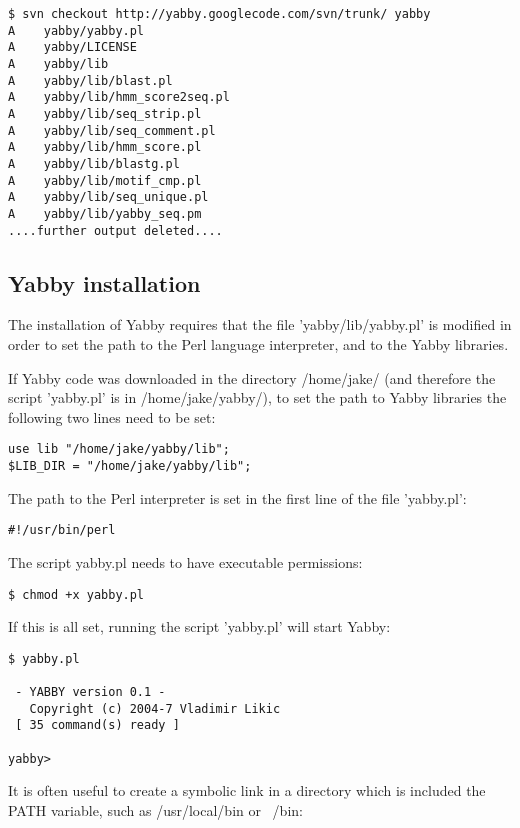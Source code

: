 \begin{verbatim}
$ svn checkout http://yabby.googlecode.com/svn/trunk/ yabby
A    yabby/yabby.pl
A    yabby/LICENSE
A    yabby/lib
A    yabby/lib/blast.pl
A    yabby/lib/hmm_score2seq.pl
A    yabby/lib/seq_strip.pl
A    yabby/lib/seq_comment.pl
A    yabby/lib/hmm_score.pl
A    yabby/lib/blastg.pl
A    yabby/lib/motif_cmp.pl
A    yabby/lib/seq_unique.pl
A    yabby/lib/yabby_seq.pm
....further output deleted....
\end{verbatim}

\subsection{Yabby installation}

The installation of Yabby requires that the file 'yabby/lib/yabby.pl' is
modified in order to set the path to the Perl language interpreter,
and to the Yabby libraries.

If Yabby code was downloaded in the directory /home/jake/ (and
therefore the script 'yabby.pl' is in /home/jake/yabby/), to set
the path to Yabby libraries the following two lines need to be
set: 

\begin{verbatim}
use lib "/home/jake/yabby/lib";
$LIB_DIR = "/home/jake/yabby/lib";
\end{verbatim}

The path to the Perl interpreter is set in the first line of the
file 'yabby.pl':

\begin{verbatim}
#!/usr/bin/perl
\end{verbatim}

The script yabby.pl needs to have executable permissions:

\begin{verbatim}
$ chmod +x yabby.pl
\end{verbatim}

If this is all set, running the script 'yabby.pl' will start Yabby:

\begin{verbatim}
$ yabby.pl

 - YABBY version 0.1 - 
   Copyright (c) 2004-7 Vladimir Likic
 [ 35 command(s) ready ]

yabby>
\end{verbatim}

It is often useful to create a symbolic link in a directory which
is included the PATH variable, such as /usr/local/bin or ~/bin:

